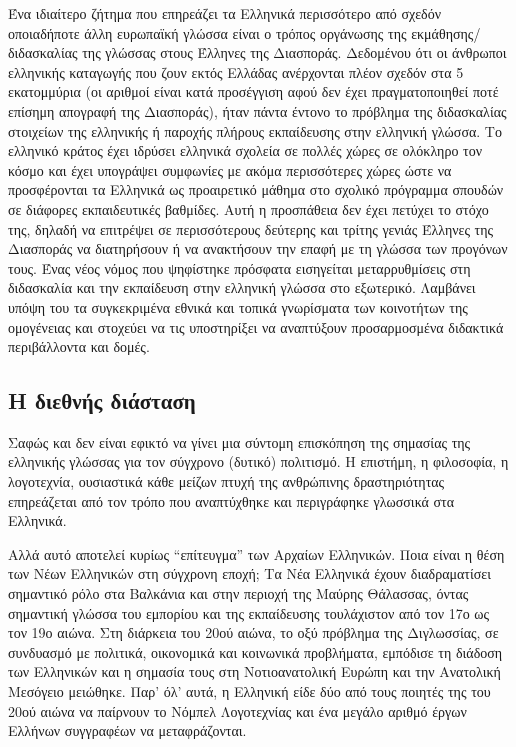 \begin{multicols}{2}
Ένα ιδιαίτερο ζήτημα που επηρεάζει τα Ελληνικά περισσότερο από σχεδόν οποιαδήποτε άλλη ευρωπαϊκή γλώσσα είναι ο τρόπος οργάνωσης της εκμάθησης/διδασκαλίας της γλώσσας στους Έλληνες της Διασποράς. Δεδομένου ότι οι άνθρωποι ελληνικής καταγωγής που ζουν εκτός Ελλάδας ανέρχονται πλέον σχεδόν στα 5 εκατομμύρια (οι αριθμοί είναι κατά προσέγγιση αφού δεν έχει πραγματοποιηθεί ποτέ επίσημη απογραφή της Διασποράς), ήταν πάντα έντονο το πρόβλημα της διδασκαλίας  στοιχείων της ελληνικής ή παροχής πλήρους εκπαίδευσης στην ελληνική γλώσσα. Το ελληνικό κράτος έχει ιδρύσει ελληνικά σχολεία σε πολλές χώρες σε ολόκληρο τον κόσμο και έχει υπογράψει συμφωνίες με ακόμα περισσότερες χώρες ώστε να  προσφέρονται τα Ελληνικά ως προαιρετικό μάθημα στο σχολικό πρόγραμμα σπουδών σε διάφορες εκπαιδευτικές βαθμίδες. Αυτή η προσπάθεια δεν έχει πετύχει το στόχο της, δηλαδή να επιτρέψει σε περισσότερους δεύτερης και τρίτης γενιάς Έλληνες της Διασποράς να διατηρήσουν ή να ανακτήσουν την επαφή με τη γλώσσα των προγόνων τους. Ένας νέος νόμος που ψηφίστηκε πρόσφατα εισηγείται μεταρρυθμίσεις στη διδασκαλία και την εκπαίδευση στην ελληνική γλώσσα στο εξωτερικό. Λαμβάνει υπόψη του τα συγκεκριμένα εθνικά και τοπικά γνωρίσματα των κοινοτήτων της ομογένειας και στοχεύει να τις υποστηρίξει να αναπτύξουν προσαρμοσμένα διδακτικά περιβάλλοντα και δομές.

\subsection{Η διεθνής διάσταση}

Σαφώς και δεν είναι εφικτό να γίνει μια σύντομη επισκόπηση της σημασίας της ελληνικής γλώσσας για τον σύγχρονο (δυτικό) πολιτισμό. Η επιστήμη, η φιλοσοφία, η λογοτεχνία, ουσιαστικά κάθε μείζων πτυχή της ανθρώπινης δραστηριότητας επηρεάζεται από τον τρόπο που αναπτύχθηκε και περιγράφηκε γλωσσικά στα Ελληνικά.

Αλλά αυτό αποτελεί κυρίως “επίτευγμα” των Αρχαίων Ελληνικών. Ποια είναι η θέση των Νέων Ελληνικών στη σύγχρονη εποχή; Τα Νέα Ελληνικά έχουν διαδραματίσει σημαντικό ρόλο στα Βαλκάνια και στην περιοχή της Μαύρης Θάλασσας, όντας σημαντική γλώσσα του εμπορίου και της εκπαίδευσης τουλάχιστον από τον 17ο ως τον 19ο αιώνα. Στη διάρκεια του 20ού αιώνα, το οξύ πρόβλημα της Διγλωσσίας, σε συνδυασμό με πολιτικά, οικονομικά και κοινωνικά προβλήματα, εμπόδισε τη διάδοση των Ελληνικών και η σημασία τους στη Νοτιοανατολική Ευρώπη και την Ανατολική Μεσόγειο μειώθηκε. Παρ' όλ' αυτά, η Ελληνική είδε δύο από τους ποιητές της του 20ού αιώνα να παίρνουν το Νόμπελ Λογοτεχνίας και ένα μεγάλο αριθμό έργων Ελλήνων συγγραφέων να μεταφράζονται.


\end{multicols}
